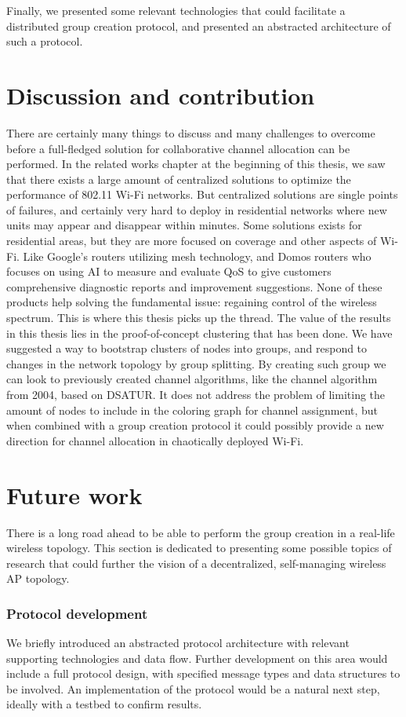 Finally, we presented some relevant technologies that could facilitate a distributed group creation protocol, and presented an abstracted architecture of such a protocol.

\section{Discussion and contribution}
There are certainly many things to discuss and many challenges to overcome before a full-fledged solution for collaborative channel allocation can be performed.
In the related works chapter at the beginning of this thesis, we saw that there exists a large amount of centralized solutions
to optimize the performance of 802.11 Wi-Fi networks. But centralized solutions are single points of failures, and certainly very hard to deploy in residential networks where new
units may appear and disappear within minutes. Some solutions exists for residential areas, but they are more focused on coverage and other aspects of Wi-Fi. Like 
Google's routers utilizing mesh technology, and Domos routers who focuses on using AI to measure and evaluate QoS to give customers comprehensive diagnostic reports and improvement suggestions. 
None of these products help solving the fundamental issue: regaining control of the wireless spectrum. This is where this thesis picks up the thread. The value of the results in this
thesis lies in the proof-of-concept clustering that has been done. We have suggested a way to bootstrap clusters of nodes into groups, and respond to changes in the network topology
by group splitting. By creating such group we can look to previously created channel algorithms, like the channel algorithm from 2004, based on DSATUR. It does not address the
problem of limiting the amount of nodes to include in the coloring graph for channel assignment, but when combined with a group creation protocol it could possibly provide a new direction for
channel allocation in chaotically deployed Wi-Fi.  

\section{Future work}
There is a long road ahead to be able to perform the group creation in a real-life wireless topology. This section is dedicated to presenting some possible topics of research
that could further the vision of a decentralized, self-managing wireless AP topology. 

\subsubsection{Protocol development}
We briefly introduced an abstracted protocol architecture with relevant supporting technologies and data flow. Further development on this area would include a full protocol design, with
specified message types and data structures to be involved. An implementation of the protocol would be a natural next step, ideally with a testbed to confirm results. 

